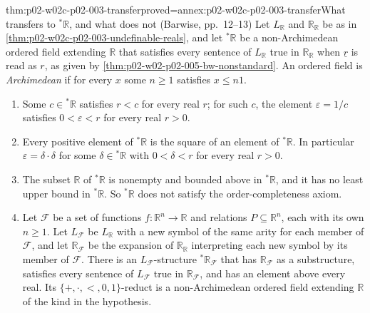 \begin{hbtheorem}{thm:p02-w02c-p02-003-transfer}{proved=annex:p02-w02c-p02-003-transfer}{What transfers to \({}^*\mathbb R\), and what does not (Barwise, pp.~12--13)}
Let \(L_{\mathbb R}\) and \(\mathbb R_{\mathbb R}\) be as in
\cref{thm:p02-w02c-p02-003-undefinable-reals}, and let \({}^*\mathbb R\) be
a non-Archimedean ordered field extending \(\mathbb R\) that satisfies
every sentence of \(L_{\mathbb R}\) true in \(\mathbb R_{\mathbb R}\) when
\(\underline r\) is read as \(r\), as given by
\cref{thm:p02-w02-p02-005-bw-nonstandard}.  An ordered field is
\emph{Archimedean} if for every \(x\) some \(n\geq1\) satisfies
\(x\leq n1\).
\begin{enumerate}
\item Some \(c\in{}^*\mathbb R\) satisfies \(r<c\) for every real \(r\);
      for such \(c\), the element \(\varepsilon=1/c\) satisfies
      \(0<\varepsilon<r\) for every real \(r>0\).
\item Every positive element of \({}^*\mathbb R\) is the square of an
      element of \({}^*\mathbb R\).  In particular
      \(\varepsilon=\delta\cdot\delta\) for some \(\delta\in{}^*\mathbb R\)
      with \(0<\delta<r\) for every real \(r>0\).
\item The subset \(\mathbb R\) of \({}^*\mathbb R\) is nonempty and bounded
      above in \({}^*\mathbb R\), and it has no least upper bound in
      \({}^*\mathbb R\).  So \({}^*\mathbb R\) does not satisfy the
      order-completeness axiom.
\item Let \(\mathcal F\) be a set of functions \(f:\mathbb R^n\to\mathbb R\)
      and relations \(P\subseteq\mathbb R^n\), each with its own
      \(n\geq1\).  Let \(L_{\mathcal F}\) be \(L_{\mathbb R}\) with a new
      symbol of the same arity for each member of \(\mathcal F\), and let
      \(\mathbb R_{\mathcal F}\) be the expansion of
      \(\mathbb R_{\mathbb R}\) interpreting each new symbol by its member
      of \(\mathcal F\).  There is an \(L_{\mathcal F}\)-structure
      \({}^*\mathbb R_{\mathcal F}\) that has \(\mathbb R_{\mathcal F}\) as a
      substructure, satisfies every sentence of \(L_{\mathcal F}\) true in
      \(\mathbb R_{\mathcal F}\), and has an element above every real.
      Its \(\{+,\cdot,<,0,1\}\)-reduct is a non-Archimedean ordered field
      extending \(\mathbb R\) of the kind in the hypothesis.
\end{enumerate}
\end{hbtheorem}


